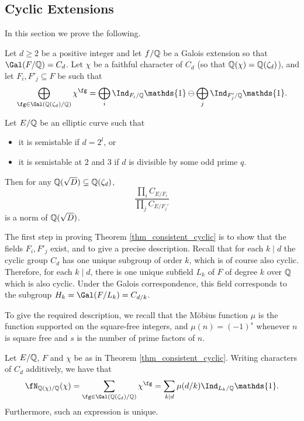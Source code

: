 \subsection{Cyclic Extensions}
In this section we prove the following. 
\begin{thm}\label{thm_consistent_cyclic}
    Let $d\geq2$ be a positive integer and let $f/\mathbb{Q}$ be a Galois extension so that $\Gal(F/\QQ)=C_d$. Let $\chi$ be a faithful character of $C_d$ (so that $\mathbb{Q}(\chi)=\mathbb{Q}(\zeta_d)$), and let $F_i,F'_j\subseteq F$ be such that
    $$\bigoplus_{\fg\in\Gal(\QQ(\zeta_d)/\QQ)}\chi^{\fg}=\bigoplus_i\Ind_{F_i/\QQ}\mathds{1}\ominus\bigoplus_j\Ind_{F'_j/\QQ}\mathds{1}.$$

    Let $E/\mathbb{Q}$ be an elliptic curve such that
    \begin{itemize}
        \item it is semistable if $d=2^l$, or
        \item it is semistable at $2$ and $3$ if $d$ is divisible by some odd prime $q$.
    \end{itemize}

    Then for any $\mathbb{Q}(\sqrt{D})\subseteq\mathbb{Q}(\zeta_d)$,
    $$\frac{\prod_i C_{E/F_i}}{\prod_j C_{E/F_j'}}$$
    is a norm of $\mathbb{Q}(\sqrt{D})$. 
\end{thm}

The first step in proving Theorem \ref{thm_consistent_cyclic} is to show that the fields $F_i, F'_j$ exist, and to give a precise description. Recall that for each $k\mid d$ the cyclic group $C_d$ has one unique subgroup of order $k$, which is of course also cyclic. Therefore, for each $k\mid d$, there is one unique subfield $L_k$ of $F$ of degree $k$ over $\mathbb{Q}$ which is also cyclic. Under the Galois correspondence, this field corresponds to the subgroup $H_k=\Gal(F/L_k)=C_{d/k}$.

To give the required description, we recall that the Möbius function $\mu$ is the function supported on the square-free integers, and $\mu(n)=(-1)^s$ whenever $n$ is square free and $s$ is the number of prime factors of $n$.

\begin{lemma}\label{lem_cyclic_decomp}
    Let $E/\mathbb{Q}$, $F$ and $\chi$ be as in Theorem \ref{thm_consistent_cyclic}. Writing characters of $C_d$ additively, we have that
    \begin{equation}\label{eqn_cyclic_relation}
        \fN_{\QQ(\chi)/\QQ}(\chi)=\sum_{\fg\in\Gal(\QQ(\zeta_d)/\QQ)}\chi^{\fg}=\sum_{k\mid d}\mu(d/k)\Ind_{L_k/\QQ}\mathds{1}.
    \end{equation}
    Furthermore, such an expression is unique.
\end{lemma}

